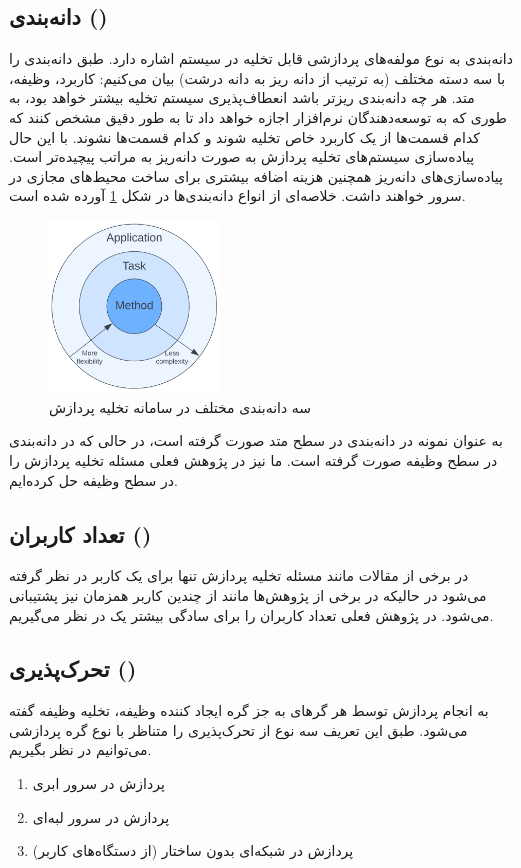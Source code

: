 \subsection*{دانه‌بندی ()}
دانه‌بندی به نوع مولفه‌های پردازشی قابل تخلیه در سیستم اشاره دارد. طبق \cite{wang2019} دانه‌بندی را با سه دسته مختلف (به ترتیب از دانه‌ ریز به دانه ‌درشت) بیان می‌کنیم: کاربرد، وظیفه، متد. هر چه دانه‌بندی ریزتر باشد انعطاف‌پذیری سیستم تخلیه بیشتر خواهد بود، به طوری که به توسعه‌دهندگان نرم‌افزار اجازه خواهد داد تا به طور دقیق مشخص کنند که کدام قسمت‌ها از یک کاربرد خاص تخلیه شوند و کدام قسمت‌ها نشوند. با این حال پیاده‌سازی سیستم‌های تخلیه پردازش به صورت دانه‌ریز به مراتب پیچیده‌تر است. پیاده‌سازی‌های دانه‌ریز همچنین هزینه اضافه بیشتری برای ساخت محیط‌های مجازی در سرور خواهند داشت. خلاصه‌ای از انواع دانه‌بندی‌ها در شکل \ref{fig:granularity} آورده شده است.
\begin{figure}[H]
	\centering
	\includegraphics[width=0.4\textwidth]{figures/granularity.png}
	\caption{سه دانه‌بندی مختلف در سامانه تخلیه پردازش}
	\label{fig:granularity}
\end{figure}
به عنوان نمونه در \cite{maui} دانه‌بندی در سطح متد صورت گرفته است، در حالی که در \cite{Liu} دانه‌بندی در سطح وظیفه صورت گرفته است. ما نیز در پژوهش فعلی مسئله تخلیه پردازش را در سطح وظیفه حل کرده‌ایم.
\newpage
\subsection*{تعداد کاربران ()}
در برخی از مقالات مانند \cite{Liu} مسئله تخلیه پردازش تنها برای یک کاربر در نظر گرفته می‌شود در حالیکه در برخی از پژوهش‌ها مانند \cite{multiuser} از چندین کاربر همزمان نیز پشتیبانی می‌شود. در پژوهش فعلی تعداد کاربران را برای سادگی بیشتر یک در نظر می‌گیریم.

\subsection*{تحرک‌پذیری ()}
به انجام پردازش توسط هر گرهای به جز گره ایجاد کننده وظیفه، تخلیه وظیفه گفته می‌شود. طبق این تعریف سه نوع از تحرک‌پذیری را متناظر با نوع گره پردازشی می‌توانیم در نظر بگیریم.
\begin{enumerate}
	\item پردازش در سرور ابری
	\item پردازش در سرور لبه‌ای
	\item پردازش در شبکه‌ای بدون ساختار (از دستگاه‌های کاربر)
\end{enumerate}

